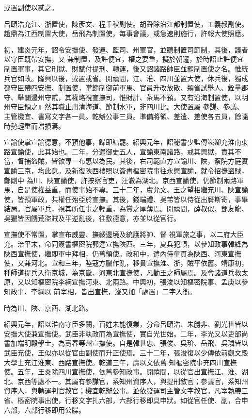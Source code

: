 \begin{pinyinscope}
 或置副使以貳之。



 呂頤浩充江、浙置使，陳彥文、程千秋副使。胡舜除沿江都制置使，工義叔副使。趙鼎為江西制置大使，岳飛為制置使，每事會議，或急速則施行，許報大使照應。



 初，建炎元年，詔令安撫使、發運、監司、州軍官，並聽制置司節制，其後，議者以守臣既帶安撫，又
 兼制置，及許便宜，權之要重，擬於朝遷，於時詔止許便宜制置軍事，其它刑獄、財賦付提刑、轉運，後又詔諸路帥臣並罷制置使之名。惟統兵官如故。隆興以後，或置或省。開禧間，江、淮、四川並置大使，休兵後，獨成都守臣帶四安撫、制置使，掌節制御前軍馬、官員升改放散、類省試舉人、銓量郡守、舉闢邊州守貳，其權略視宣撫司，惟財計、茶馬不預。又有沿海制置使，以明州守臣領之』然其職止肅清海道、節制水軍，非四川比。大使置屬
 參謀、參議、主管機宜、書寫文字各一員。乾辦公事三員。準備將領、差遣、差使各五員，餘隨時勢輕重而增損焉。



 宣諭使掌宣諭德意，不預他事，歸即結罷。紹興元年，詔秘書少監傳崧卿充淮南東路宣諭使，此其始也。二年，分遣御史五人，宣諭東南諸路，戒其興獄，責其不當，督捕盜賊，皆欲專一布惠以為民。其後，右司範直方宣諭川、陜，察院方庭實宣諭三京，均此意。及新復陜西樓照以簽書樞密院事往永興宣諭，就令招撫盜賊，鄭剛中
 為川、陜宣諭使，許按察官吏，汪澈為湖北。京西宣諭使，仍節制兩路軍馬，自是使權益重，而使事始不專。三十二年，虞允文、王之望相繼充川、陜宣諭使，皆預軍政，共權任殆亞於宣撫。其後，錢端禮、吳芾皆以侍從出膺斯寄，事畢結局。官屬軍兵，視其所任事之輕重，為賞之厚薄焉。開禧間，薛叔似、鄧友龍、吳獵皆因饑荒盜賊及平逆亂後，往敷德意，亦並以從官行。



 宣撫使不常置，掌宣布威靈、撫綏邊境及統護將帥、督
 視軍旅之事，以二府大臣充。治平末，命同簽書樞密院郭逵宣撫陜西。三年，夏兵犯順，以參知政事韓絳為陜西宣撫使，繼即軍中拜相，仍舊領使。政和中，遣內侍童貫為陜西、河東宣撫使，又兼河北。宣和三年，睦寇方臘作亂，移貫宣撫淮、浙，賊平依舊。靖康初，種師道提兵入衛京城，為京畿、河東北宣撫使，凡勤王之師屬焉。及會諸道兵救太原，又以知樞密院李綱宣撫河東、北兩路。中興初，張浚以知樞密院事、孟庚以參知政事、李綱以
 前宰相，皆出宣撫，浚又加「處置」二字入銜。



 時為川、陜、京西、湖北路。



 紹興元年，詔以淮南守臣多闕，百姓未能復業，分命呂頤浩、朱勝非、劉光世皆以安撫大使兼宣撫使。武臣非執政而為宣撫使，實自光世始。二年，李光又以吏部尚書加端明殿學士，為壽春等州宣撫使。自是韓世忠、張俊、吳玠、岳飛、吳璘皆以武臣充使，王似亦以從官由副使而升正使焉。三十二年，張浚復以少傳依前觀文殿大學士充江淮東、西路宣撫使。乾道三年，虞以文依舊
 知樞密院事充四川宣撫使。五年，王炎除四川宣撫使，依舊參知政事。開禧間，以從官出宣撫江、淮、湖北、京西等處不一。其屬有參謀官，系知州資序人，與提刑敘官；參議官，系知州資序人，與轉運判官敘官；機宜乾辦公事。並依發運司主管文字敘官。凡宰執帶三省、樞密院事出使，行移文字扎六部，六部行移即具申狀。如從官任使、副，合申六部，六部行移即用公牒。




\end{pinyinscope}
